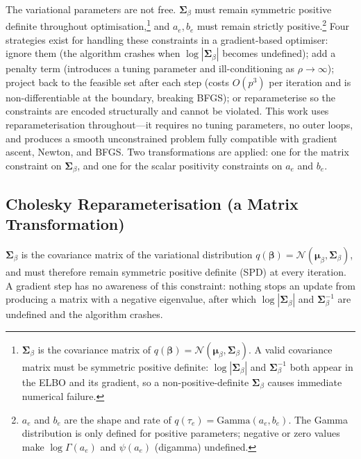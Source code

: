 \documentclass[11pt,a4paper]{article}
\newcommand{\N}{\mathcal{N}}
\begin{document}
The variational parameters are not free. $\bm{\Sigma}_\beta$ must remain symmetric positive definite throughout optimisation,\footnote{$\bm{\Sigma}_\beta$ is the covariance matrix of $q(\bm{\beta}) = \mathcal{N}(\bm{\mu}_\beta,\bm{\Sigma}_\beta)$. A valid covariance matrix must be symmetric positive definite: $\log|\bm{\Sigma}_\beta|$ and $\bm{\Sigma}_\beta^{-1}$ both appear in the ELBO and its gradient, so a non-positive-definite $\bm{\Sigma}_\beta$ causes immediate numerical failure.} and $a_e, b_e$ must remain strictly positive.\footnote{$a_e$ and $b_e$ are the shape and rate of $q(\tau_e)=\mathrm{Gamma}(a_e,b_e)$. The Gamma distribution is only defined for positive parameters; negative or zero values make $\log\Gamma(a_e)$ and $\psi(a_e)$ (digamma) undefined.} Four strategies exist for handling these constraints in a gradient-based optimiser: ignore them (the algorithm crashes when $\log|\bm{\Sigma}_\beta|$ becomes undefined); add a penalty term (introduces a tuning parameter and ill-conditioning as $\rho \to \infty$); project back to the feasible set after each step (costs $O(p^3)$ per iteration and is non-differentiable at the boundary, breaking BFGS); or reparameterise so the constraints are encoded structurally and cannot be violated. This work uses reparameterisation throughout---it requires no tuning parameters, no outer loops, and produces a smooth unconstrained problem fully compatible with gradient ascent, Newton, and BFGS. Two transformations are applied: one for the matrix constraint on $\bm{\Sigma}_\beta$, and one for the scalar positivity constraints on $a_e$ and $b_e$.

\subsection*{Cholesky Reparameterisation (a Matrix Transformation)}

$\bm{\Sigma}_\beta$ is the covariance matrix of the variational distribution $q(\bm{\beta}) = \N(\bm{\mu}_\beta, \bm{\Sigma}_\beta)$, and must therefore remain symmetric positive definite (SPD) at every iteration. A gradient step has no awareness of this constraint: nothing stops an update from producing a matrix with a negative eigenvalue, after which $\log|\bm{\Sigma}_\beta|$ and $\bm{\Sigma}_\beta^{-1}$ are undefined and the algorithm crashes.
\end{document}
